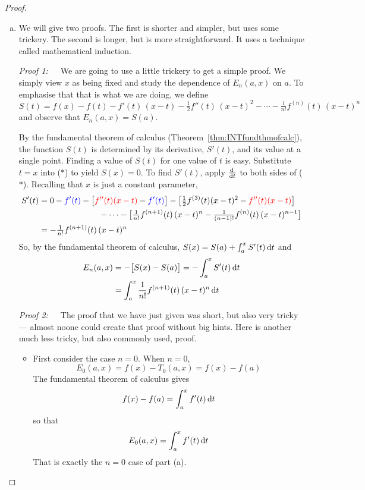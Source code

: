 \begin{proof}
\begin{enumerate}[(a)]
\item 
We will give two proofs. The first is shorter and simpler, but uses some trickery. The second is longer, but is more straightforward. It uses a technique 
called mathematical induction.

\emph{Proof 1:}\ \ \ 
We are going to use a little trickery to get a simple proof.
We simply view $x$ as being fixed and study the dependence of $E_n(a,x)$
on $a$. To emphasise that that is what we are doing, we define
\begin{equation*}
S(t) = f(x) - f(t) -f'(t)\,(x-t)-\tfrac{1}{2}f''(t)\,(x-t)^2
                      -\cdots-\tfrac{1}{n!}f^{(n)}(t)\, (x-t)^n
\tag{$*$}\end{equation*}
and observe that $E_n(a,x) = S(a)$.

By the fundamental theorem of calculus (Theorem~\ref{thm:INTfundthmofcalc}), 
the function $S(t)$ is determined by its derivative, $S'(t)$, and its value at a single 
point. Finding a value of $S(t)$ for one value of $t$ is easy. Substitute $t=x$ 
into ($*$) to yield $S(x)=0$. To find $S'(t)$, apply $\diff{}{t}$ to both sides of ($*$).  
Recalling that $x$ is just a constant parameter,
\begin{align*}
S'(t)&= 0 - \textcolor{blue}{f'(t)} 
         - \big[\textcolor{red}{f''(t)(x-t)}-\textcolor{blue}{f'(t)}\big]
         -\big[\tfrac{1}{2}f^{(3)}(t)(x-t)^2-\textcolor{red}{f''(t)(x-t)}\big]
\\
&\hskip1in  -\cdots-\big[\tfrac{1}{n!}  f^{(n+1)}(t)\,(x-t)^n
               -\tfrac{1}{(n-1)!}f^{(n)}(t)\,(x-t)^{n-1} \big]
\\
&=-\tfrac{1}{n!}  f^{(n+1)}(t)\,(x-t)^n
\end{align*}
So, by the fundamental theorem of calculus, $S(x)=S(a)+\int_a^x S'(t)\,\mathrm{d}t$ and
\begin{align*}
E_n(a,x) &= -\big[S(x)-S(a)\big] = - \int_a^x S'(t)\,\mathrm{d}t
\\
&=\int_a^x \frac{1}{n!}f^{(n+1)}(t)\, (x-t)^n\,\mathrm{d}t
\end{align*}

\emph{Proof 2:}\ \ \ 
The proof that we have just given was short, but also very tricky --- almost noone could create that proof without big hints. Here is another 
much less tricky, but also commonly used, proof.
\begin{itemize}
\item
First consider the case $n=0$. When $n=0$,
\begin{equation*}
E_0(a,x) = f(x) - T_0(a,x) = f(x) -f(a)
\end{equation*}
The fundamental theorem of calculus gives
\begin{equation*}
f(x)-f(a) = \int_a^x f'(t)\,\mathrm{d}t
\end{equation*}
so that
\begin{equation*}
E_0(a,x) = \int_a^x f'(t)\,\mathrm{d}t
\end{equation*}
That is exactly the $n=0$ case of part (a).


\end{itemize}
\end{enumerate}
\end{proof}
